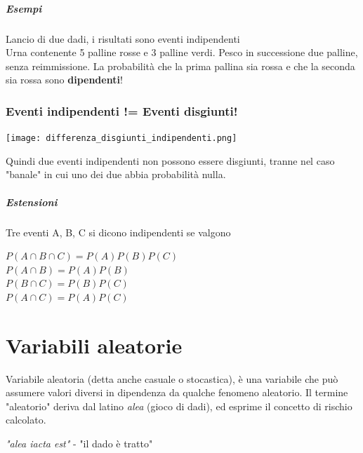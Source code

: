 \documentclass[12pt, a4paper, openany]{book}
\begin{document}
\paragraph{Esempi}
Lancio di due dadi, i risultati sono eventi indipendenti
\\ Urna contenente 5 palline rosse e 3 palline verdi. Pesco in successione due palline, 
senza reimmissione. La probabilità che la prima pallina sia rossa e che la seconda sia rossa
sono \textbf{dipendenti}!

\subsection{Eventi indipendenti != Eventi disgiunti!}
\begin{center}
    \texttt{[image: differenza\_disgiunti\_indipendenti.png]}
\end{center}
Quindi due eventi indipendenti non possono essere disgiunti,
tranne nel caso "banale" in cui uno dei due abbia probabilità
nulla.

\paragraph{Estensioni}
Tre eventi A, B, C si dicono indipendenti se valgono
\begin{center}
    $P(A \cap B \cap C) = P(A)P(B)P(C)$
    \\$P(A \cap B) = P(A)P(B)$
    \\$P(B \cap C) = P(B)P(C)$
    \\$P(A \cap C) = P(A)P(C)$
\end{center}

\chapter{Variabili aleatorie}
Variabile aleatoria (detta anche casuale o stocastica), è una variabile che può assumere valori
diversi in dipendenza da qualche fenomeno aleatorio. Il termine "aleatorio" deriva dal latino \textit{alea} (gioco di dadi), ed esprime il
concetto di rischio calcolato.
\begin{center}
    \textit{"alea iacta est"} - "il dado è tratto"
\end{center}
\end{document}
